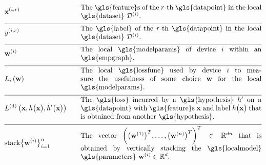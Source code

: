 \begin{align} 
		&\featurevec^{(\nodeidx,\sampleidx)} & \quad & \parbox{.75\textwidth}{The \gls{feature}s of the $\sampleidx$-th \gls{datapoint} in 
		the local \gls{dataset} $\localdataset{\nodeidx}$.} \nonumber \\[2mm] \hline \nonumber\\[-5mm]
	&\truelabel^{(\nodeidx,\sampleidx)} & \quad & \parbox{.75\textwidth}{The \gls{label} of the $\sampleidx$-th \gls{datapoint} in 
		the local \gls{dataset} $\localdataset{\nodeidx}$.} \nonumber \\[2mm] \hline \nonumber\\[-5mm]
		&\localparams{\nodeidx} & \quad & \parbox{.75\textwidth}{The local \gls{modelparams} of device $\nodeidx$ within an \gls{empgraph}.} \nonumber \\[2mm] \hline \nonumber\\[-5mm]
		&\locallossfunc{\nodeidx}{\weights} & \quad & \parbox{.75\textwidth}{The local \gls{lossfunc} used by device $\nodeidx$ 
		to measure the usefulness of some choice $\weights$ for the local \gls{modelparams}.}\nonumber \\[2mm] \hline \nonumber\\[-5mm]
	& \gtvloss{\featurevec}{\hypothesis\big(\featurevec\big)}{\hypothesis'\big(\featurevec\big)}& \quad & \parbox{.75\textwidth}{The \gls{loss} 
		incurred by a \gls{hypothesis} $\hypothesis'$ on a \gls{datapoint} with \gls{feature}s $\featurevec$ and label 
		$\hypothesis\big( \featurevec\big)$ that is obtained from another \gls{hypothesis}.}\nonumber \\[2mm] \hline \nonumber\\[-5mm]
		& 	{\rm stack} \big\{ \weights^{(\nodeidx)} \big\}_{\nodeidx=1}^{\nrnodes} & \quad & \parbox{.75\textwidth}{The vector $\bigg( \big(\weights^{(1)}  \big)^{T}, \ldots, \big(\weights^{(\nrnodes)}  \big)^{T} \bigg)^{T} \in \mathbb{R}^{\dimlocalmodel\nrnodes}$ that 
			is obtained by vertically stacking the \gls{localmodel} \gls{parameters} $\weights^{(\nodeidx)} \in \mathbb{R}^{\dimlocalmodel}$.} \nonumber  
\end{align}        


